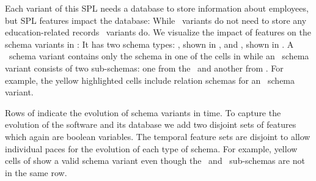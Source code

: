 Each variant of this SPL needs a database to store information
about employees, but SPL features impact the database: While
\basic\ variants do not need to store any education-related records 
\educational\ variants do. 
We visualize the impact of features on the schema variants in :
It has two
schema types: \basic, shown in , and \educational, shown in .
A \basic\ schema variant contains only the schema in one of the cells in 
while an \educational\ schema variant consists of two sub-schemas: one from the \basic\ 
and another from . For example,
the yellow highlighted cells include relation schemas for an \educational\ schema variant. 

%
Rows of  indicate the evolution of schema variants in time.
To capture the evolution of the software and its database we add 
two disjoint sets of features which again are boolean variables.
The temporal feature sets are disjoint to allow 
individual paces for the evolution of each type of schema. For example,
yellow cells of \tabref{mot} show a valid schema variant even though
the \basic\ and \educational\ sub-schemas are not in the same row. 
%

